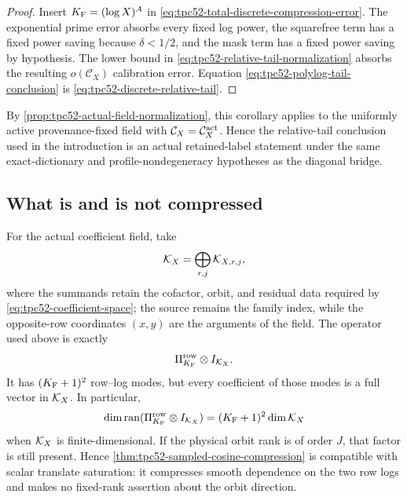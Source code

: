 \begin{proof}
Insert \(K_{\rm F}=(\log X)^A\) in
\eqref{eq:tpc52-total-discrete-compression-error}.  The exponential
prime error absorbs every fixed log power, the squarefree term has a
fixed power saving because \(\delta<1/2\), and the mask term has a
fixed power saving by hypothesis.  The lower bound in
\eqref{eq:tpc52-relative-tail-normalization} absorbs the resulting
\(o(\mathcal C_X)\) calibration error.  Equation
\eqref{eq:tpc52-polylog-tail-conclusion} is
\eqref{eq:tpc52-discrete-relative-tail}.
\end{proof}

By \cref{prop:tpc52-actual-field-normalization}, this corollary applies to
the uniformly active provenance-fixed field with
\(\mathcal C_X=\mathcal C_X^{\rm act}\).  Hence the relative-tail conclusion
used in the introduction is an actual retained-label statement under the
same exact-dictionary and profile-nondegeneracy hypotheses as the diagonal
bridge.

\subsection{What is and is not compressed}

For the actual coefficient field, take
\begin{equation}
 \mathcal K_X
 =\bigoplus_{r,j}\mathcal K_{X,r,j},
 \label{eq:tpc52-retained-orbit-fiber}
\end{equation}
where the summands retain the cofactor, orbit, and residual data required
by \eqref{eq:tpc52-coefficient-space}; the source remains the family index,
while the opposite-row coordinates \((x,y)\) are the arguments of the field.  The
operator used above is exactly
\begin{equation}
 \Pi_{K_{\rm F}}^{\rm row}\otimes I_{\mathcal K_X}.
 \label{eq:tpc52-row-only-projection}
\end{equation}
It has \((K_{\rm F}+1)^2\) row--log modes, but every coefficient of those modes
is a full vector in \(\mathcal K_X\).  In particular,
\begin{equation}
 \dim\operatorname{ran}(\Pi_{K_{\rm F}}^{\rm row}\otimes I_{\mathcal K_X})
 =(K_{\rm F}+1)^2\dim\mathcal K_X
 \label{eq:tpc52-no-orbit-rank-compression}
\end{equation}
when \(\mathcal K_X\) is finite-dimensional.  If the physical orbit rank is of
order \(J\), that factor is still present.  Hence
\cref{thm:tpc52-sampled-cosine-compression} is compatible with scalar
translate saturation: it compresses smooth dependence on the two row
logs and makes no fixed-rank assertion about the orbit direction.
